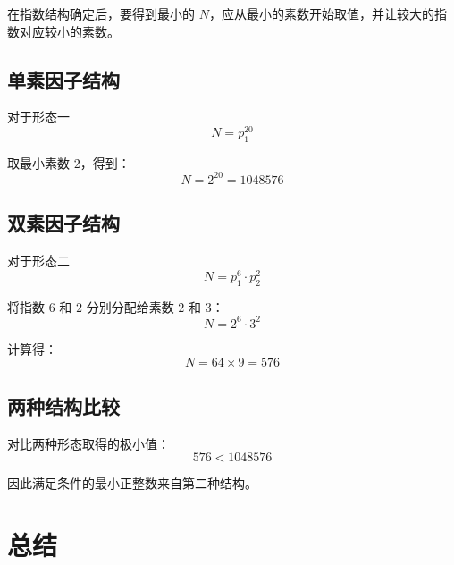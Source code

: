 \documentclass[11pt,a4paper]{ctexart}
\begin{document}
在指数结构确定后，要得到最小的 $N$，应从最小的素数开始取值，并让较大的指数对应较小的素数。

\subsection*{单素因子结构}

对于形态一
\[
  N = p_1^{20}
\]

取最小素数 $2$，得到：
\[
  N = 2^{20} = 1048576
\]

\subsection*{双素因子结构}

对于形态二
\[
  N = p_1^6 \cdot p_2^2
\]

将指数 $6$ 和 $2$ 分别分配给素数 $2$ 和 $3$：
\[
  N = 2^6 \cdot 3^2
\]

计算得：
\[
  N = 64 \times 9 = 576
\]

\subsection*{两种结构比较}

对比两种形态取得的极小值：
\[
  576 < 1048576
\]

因此满足条件的最小正整数来自第二种结构。

\section{总结}
\end{document}
